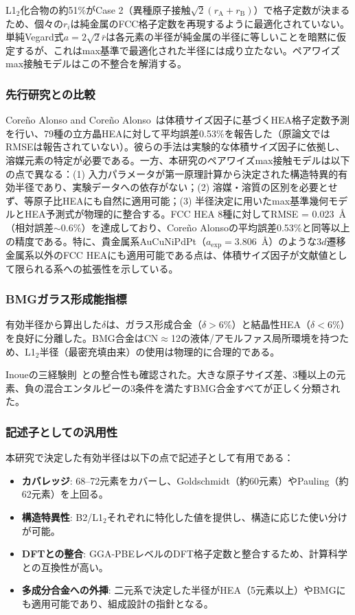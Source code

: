 \documentclass[a4paper,10pt,5p]{elsarticle}
\begin{document}
L1$_2$化合物の約51\%がCase 2（異種原子接触$\sqrt{2}(r_\mathrm{A}+r_\mathrm{B})$）で格子定数が決まるため、個々の$r_i$は純金属のFCC格子定数を再現するように最適化されていない。単純Vegard式$a = 2\sqrt{2}\bar{r}$は各元素の半径が純金属の半径に等しいことを暗黙に仮定するが、これはmax基準で最適化された半径には成り立たない。ペアワイズmax接触モデルはこの不整合を解消する。

\subsubsection{先行研究との比較}
Coreño Alonso and Coreño Alonso~\cite{Alonso2021}は体積サイズ因子に基づくHEA格子定数予測を行い、79種の立方晶HEAに対して平均誤差0.53\%を報告した（原論文ではRMSEは報告されていない）。彼らの手法は実験的な体積サイズ因子に依拠し、溶媒元素の特定が必要である。一方、本研究のペアワイズmax接触モデルは以下の点で異なる：(1) 入力パラメータが第一原理計算から決定された構造特異的有効半径であり、実験データへの依存がない；(2) 溶媒・溶質の区別を必要とせず、等原子比HEAにも自然に適用可能；(3) 半径決定に用いたmax基準幾何モデルとHEA予測式が物理的に整合する。FCC HEA 8種に対してRMSE = 0.023~\AA（相対誤差$\sim$0.6\%）を達成しており、Coreño Alonsoの平均誤差0.53\%と同等以上の精度である。特に、貴金属系AuCuNiPdPt（$a_\mathrm{exp} = 3.806$~\AA）のような3$d$遷移金属系以外のFCC HEAにも適用可能である点は、体積サイズ因子が文献値として限られる系への拡張性を示している。

\subsubsection{BMGガラス形成能指標}
有効半径から算出した$\delta$は、ガラス形成合金（$\delta > 6$\%）と結晶性HEA（$\delta < 6$\%）を良好に分離した。BMG合金はCN$\approx$12の液体/アモルファス局所環境を持つため、L1$_2$半径（最密充填由来）の使用は物理的に合理的である。

Inoueの三経験則~\cite{inoue2000}との整合性も確認された。大きな原子サイズ差、3種以上の元素、負の混合エンタルピーの3条件を満たすBMG合金すべてが正しく分類された。

\subsubsection{記述子としての汎用性}
本研究で決定した有効半径は以下の点で記述子として有用である：
\begin{itemize}
\setlength{\parskip}{0cm}
\setlength{\itemsep}{0cm}
    \item \textbf{カバレッジ}: 68--72元素をカバーし、Goldschmidt（約60元素）やPauling（約62元素）を上回る。
    \item \textbf{構造特異性}: B2/L1$_2$それぞれに特化した値を提供し、構造に応じた使い分けが可能。
    \item \textbf{DFTとの整合}: GGA-PBEレベルのDFT格子定数と整合するため、計算科学との互換性が高い。
    \item \textbf{多成分合金への外挿}: 二元系で決定した半径がHEA（5元素以上）やBMGにも適用可能であり、組成設計の指針となる。
\end{itemize}
\end{document}
